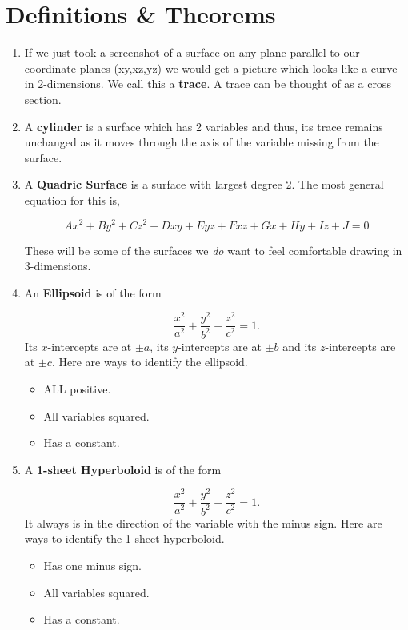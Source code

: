 \documentclass[11pt]{article}
\begin{document}
\section{Definitions \& Theorems}
\begin{enumerate}
    \item If we just took a screenshot of a surface on any plane parallel to our coordinate planes (xy,xz,yz) we would get a picture which looks like a curve in 2-dimensions. We call this a \textbf{trace}. A trace can be thought of as a cross section.
    \item  A \textbf{cylinder} is a surface which has 2 variables and thus, its trace remains unchanged as it moves through the axis of the variable missing from the surface.
    \item A \textbf{Quadric Surface} is a surface with largest degree 2. The most general equation for this is,

    \begin{equation*}
        Ax^2+By^2+Cz^2+Dxy+Eyz+Fxz+Gx+Hy+Iz+J=0
    \end{equation*}

These will be some of the surfaces we \emph{do} want to feel comfortable drawing in 3-dimensions.

\item An \textbf{Ellipsoid} is of the form 

\begin{equation*}
    \frac{x^2}{a^2}+\frac{y^2}{b^2}+\frac{z^2}{c^2}=1.
\end{equation*} 
Its $x$-intercepts are at $\pm a$, its $y$-intercepts are at $\pm b$ and its $z$-intercepts are at $\pm c$. Here are ways to identify the ellipsoid.
\begin{itemize}
    \item ALL positive.
    \item All variables squared.
    \item Has a constant.
\end{itemize}

\item A \textbf{1-sheet Hyperboloid} is of the form 

\begin{equation*}
    \frac{x^2}{a^2}+\frac{y^2}{b^2}-\frac{z^2}{c^2}=1.
\end{equation*} 
It always is in the direction of the variable with the minus sign. Here are ways to identify the 1-sheet hyperboloid.
\begin{itemize}
    \item Has one minus sign.
    \item All variables squared.
    \item Has a constant.
\end{itemize}


\end{enumerate}
\end{document}
